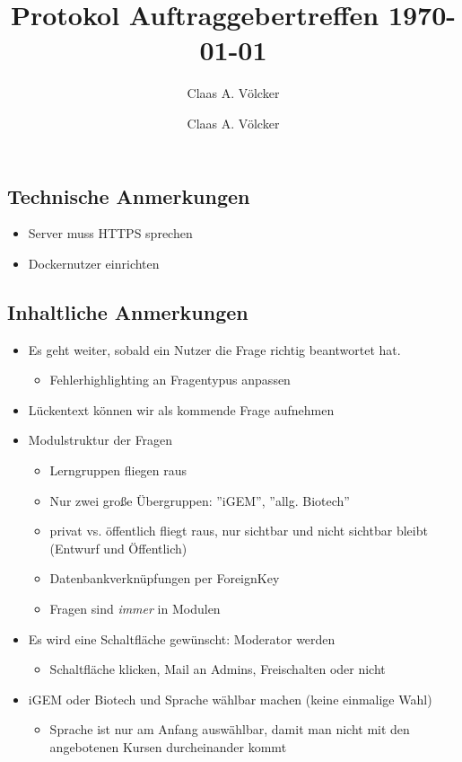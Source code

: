 \documentclass[colorback, accentcolor=tud1c, paper=a4]{tudexercise}
\title{Protokol Auftraggebertreffen \today}
\subtitle{Claas A. Völcker}
\author{Claas A. Völcker}
\begin{document}
	
\maketitle

\begin{multicols}{2}
\subsection*{Technische Anmerkungen}
\begin{itemize}
	\item Server muss HTTPS sprechen
	\item Dockernutzer einrichten
\end{itemize}
\subsection*{Inhaltliche Anmerkungen}
\begin{itemize}
	\item Es geht weiter, sobald ein Nutzer die Frage richtig beantwortet hat.
	\begin{itemize}
		\item Fehlerhighlighting an Fragentypus anpassen
	\end{itemize}
	\item Lückentext können wir als kommende Frage aufnehmen
	\item Modulstruktur der Fragen
	\begin{itemize}
		\item Lerngruppen fliegen raus
		\item Nur zwei große Übergruppen: ''iGEM'', ''allg. Biotech''
		\item privat vs. öffentlich fliegt raus, nur sichtbar und nicht sichtbar bleibt (Entwurf und Öffentlich)
		\item Datenbankverknüpfungen per ForeignKey
		\item Fragen sind \emph{immer} in Modulen
	\end{itemize}
	\item Es wird eine Schaltfläche gewünscht: Moderator werden
	\begin{itemize}
		\item Schaltfläche klicken, Mail an Admins, Freischalten oder nicht
	\end{itemize}
	\item iGEM oder Biotech und Sprache wählbar machen (keine einmalige Wahl)
	\begin{itemize}
		\item Sprache ist nur am Anfang auswählbar, damit man nicht mit den angebotenen Kursen durcheinander kommt

\end{itemize}
\end{itemize}
\end{multicols}
\end{document}

